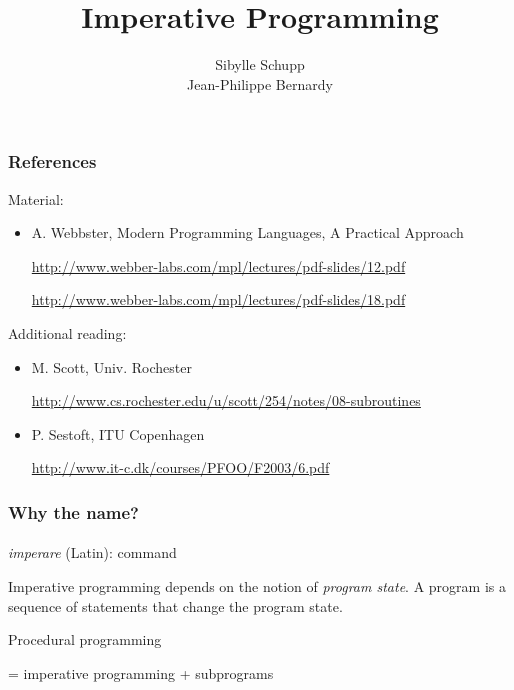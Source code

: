 \documentclass{beamer}
\title[]
{Imperative Programming}
\subtitle{} %
\author[Jean-Philippe Bernardy] %
{Sibylle Schupp\inst{2} \\
Jean-Philippe Bernardy\inst{1}}
\institute[Universities of Somewhere and Elsewhere] 
{
  \inst{1}%
  Department of Computing Science\\
  Chalmers University of Technology\\
  \inst{2}%
  Institute for Software Systems\\
  Hamburg University of Technology
}
\date%
\begin{document}
\begin{frame}
  \titlepage
\end{frame}


\begin{frame}[fragile]
\frametitle{References}
Material:
\begin{itemize}
\item 
A. Webbster, Modern Programming Languages, A Practical Approach

\url{
http://www.webber-labs.com/mpl/lectures/pdf-slides/12.pdf} 

\url{
http://www.webber-labs.com/mpl/lectures/pdf-slides/18.pdf}

\end{itemize}

Additional reading:
\begin{itemize}
\item M. Scott, Univ. Rochester

\url{
http://www.cs.rochester.edu/u/scott/254/notes/08-subroutines}

\item P. Sestoft, ITU Copenhagen

\url{http://www.it-c.dk/courses/PFOO/F2003/6.pdf}
\end{itemize}
\end{frame}

\begin{frame}[fragile]
\frametitle{Why the name?}
\framesubtitle{}
\textit{imperare} (Latin): command
\bigskip

Imperative programming depends on the notion of \textit{program state}.
A program is a sequence of statements that change the program state.

\bigskip
Procedural programming 

= imperative programming + subprograms

\end{frame}
\end{document}
